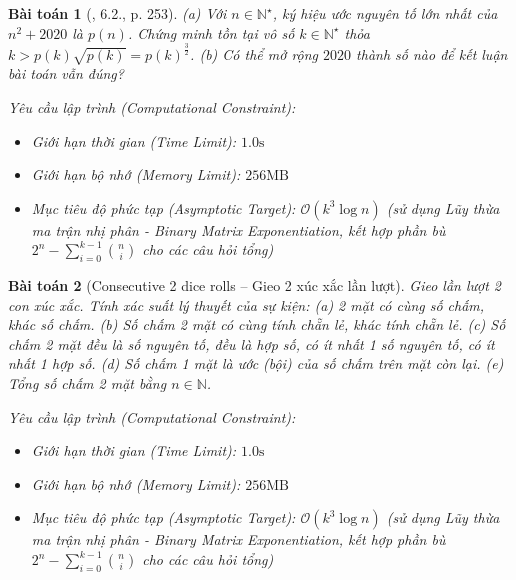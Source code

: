 \documentclass{article}
\newtheorem{baitoan}{Bài toán}
\begin{document}
\begin{baitoan}[\cite{Quoc_Long_Dat_Nam_VMC}, 6.2., p. 253]
	(a) Với $n\in\mathbb{N}^\star$, ký hiệu ước nguyên tố lớn nhất của $n^2 + 2020$ là $p(n)$. Chứng minh tồn tại vô số $k\in\mathbb{N}^\star$ thỏa $k > p(k)\sqrt{p(k)} = p(k)^{\frac{3}{2}}$. (b) Có thể mở rộng $2020$ thành số nào để kết luận bài toán vẫn đúng?

    \vspace{0.5em}
    \emph{Yêu cầu lập trình (Computational Constraint):}
    \begin{itemize}
        \item Giới hạn thời gian (Time Limit): $1.0\mathrm{s}$
        \item Giới hạn bộ nhớ (Memory Limit): $256\mathrm{MB}$
        \item Mục tiêu độ phức tạp (Asymptotic Target): $\mathcal{O}(k^3 \log n)$ (sử dụng Lũy thừa ma trận nhị phân - Binary Matrix Exponentiation, kết hợp phần bù $2^n - \sum_{i=0}^{k-1} \binom{n}{i}$ cho các câu hỏi tổng)
    \end{itemize}
\end{baitoan}


\begin{baitoan}[Consecutive 2 dice rolls -- Gieo 2 xúc xắc lần lượt]
	Gieo lần lượt 2 con xúc xắc. Tính xác suất lý thuyết của sự kiện: (a) 2 mặt có cùng số chấm, khác số chấm. (b) Số chấm 2 mặt có cùng tính chẵn lẻ, khác tính chẵn lẻ. (c) Số chấm 2 mặt đều là số nguyên tố, đều là hợp số, có ít nhất 1 số nguyên tố, có ít nhất 1 hợp số. (d) Số chấm 1 mặt là ước (bội) của số chấm trên mặt còn lại. (e) Tổng số chấm 2 mặt bằng $n\in\mathbb{N}$.

    \vspace{0.5em}
    \emph{Yêu cầu lập trình (Computational Constraint):}
    \begin{itemize}
        \item Giới hạn thời gian (Time Limit): $1.0\mathrm{s}$
        \item Giới hạn bộ nhớ (Memory Limit): $256\mathrm{MB}$
        \item Mục tiêu độ phức tạp (Asymptotic Target): $\mathcal{O}(k^3 \log n)$ (sử dụng Lũy thừa ma trận nhị phân - Binary Matrix Exponentiation, kết hợp phần bù $2^n - \sum_{i=0}^{k-1} \binom{n}{i}$ cho các câu hỏi tổng)
    \end{itemize}
\end{baitoan}
\end{document}
